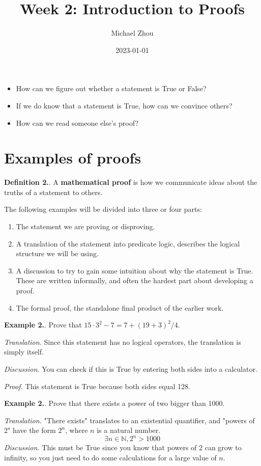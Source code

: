 \documentclass{article}
\title{Week 2: Introduction to Proofs}
\author{Michael Zhou}
\date{2023-01-01}
\newcounter{defcount}
\newcounter{excount}
\newcommand\df{\stepcounter{defcount} \textbf{Definition 2.\thedefcount}. }
\newcommand\ex{\stepcounter{excount} \textbf{Example 2.\theexcount}. }
\begin{document}
\maketitle

\begin{itemize}
    \item How can we figure out whether a statement is True or False?
    \item If we do know that a statement is True, how can we convince others?
    \item How can we read someone else's proof?
\end{itemize}

\section{Examples of proofs}
\df A \textbf{mathematical proof} is how we communicate ideas about the truths 
of a statement to others. 

The following examples will be divided into three or four parts:
\begin{enumerate}
    \item The statement we are proving or disproving. 
    \item A translation of the statement into predicate logic, describes the 
        logical structure we will be using.
    \item A discussion to try to gain some intuition about why the statement is True. 
        These are written informally, and often the hardest part about developing a proof.
    \item The formal proof, the standalone final product of the earlier work.
\end{enumerate}

\ex Prove that $15 \cdot 3^2 - 7 = 7 + (19+3)^2 / 4$.

\textit{Translation.} Since this statement has no logical operators, the 
translation is simply itself.

\textit{Discussion.} You can check if this is True by entering both sides into 
a calculator. 

\textit{Proof.} This statement is True because both sides equal 128. 

\ex Prove that there exists a power of two bigger than 1000.

\textit{Translation.} "There exists" translates to an existential quantifier, 
and "powers of 2" have the form $2^n$, where $n$ is a natural number.
$$\exists n \in \mathbb{N}, 2^n > 1000$$
\textit{Discussion.} This must be True since you know that powers of 2 can 
grow to infinity, so you just need to do some calculations for a large value 
of $n$.
\end{document}
